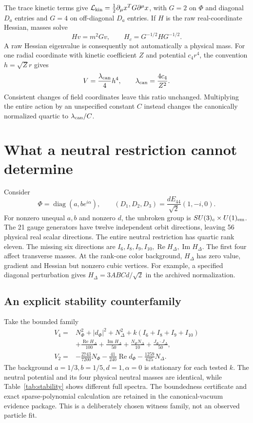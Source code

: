 \documentclass[11pt]{article}
\newcommand{\Rea}{\operatorname{Re}}
\newcommand{\Ima}{\operatorname{Im}}
\begin{document}
The trace kinetic terms give
$\mathcal L_{\rm kin}=\tfrac12\partial_\mu x^TG\partial^\mu x$,
with $G=2$ on $\Phi$ and diagonal $D_a$ entries and $G=4$ on off-diagonal
$D_a$ entries. If $H$ is the raw real-coordinate Hessian, masses solve
\begin{equation}
 Hv=m^2Gv,\qquad H_c=G^{-1/2}HG^{-1/2}.
\end{equation}
A raw Hessian eigenvalue is consequently not automatically a physical mass.
For one radial coordinate with kinetic coefficient $Z$ and potential
$c_4r^4$, the convention $h=\sqrt Zr$ gives
\begin{equation}
 V=\frac{\lambda_{\rm can}}4h^4,
 \qquad \lambda_{\rm can}=\frac{4c_4}{Z^2}.
\end{equation}
Consistent changes of field coordinates leave this ratio unchanged.
Multiplying the entire action by an unspecified constant $C$ instead changes
the canonically normalized quartic to $\lambda_{\rm can}/C$.

\section{What a neutral restriction cannot determine}
Consider
\begin{equation}\label{eq:neutral}
 \Phi=\operatorname{diag}(a,b e^{i\alpha}),\qquad
 (D_1,D_2,D_3)=\frac{dE_{44}}{\sqrt2}(1,-i,0).
\end{equation}
For nonzero unequal $a,b$ and nonzero $d$, the unbroken group is
$SU(3)_c\times U(1)_{\rm em}$. The 21 gauge generators have twelve
independent orbit directions, leaving 56 physical real scalar directions.
The entire neutral restriction has quartic rank eleven. The missing six
directions are $I_6,I_8,I_9,I_{10},\Rea H_\Delta,\Ima H_\Delta$.
The first four affect transverse masses. At the rank-one color background,
$H_\Delta$ has zero value, gradient and Hessian but nonzero cubic vertices.
For example, a specified diagonal perturbation gives
$H_\Delta=3ABCd/\sqrt2$ in the archived normalization.

\subsection{An explicit stability counterfamily}
Take the bounded family
\begin{align}
 V_4={}&N_\Phi^2+|d_\Phi|^2+N_\Delta^2
 +k(I_6+I_8+I_9+I_{10})\nonumber\\
 &+\frac{\Rea H_\Delta}{100}+\frac{\Ima H_\Delta}{50}
 +\frac{N_\Phi N_\Delta}{10}+\frac{J_\Phi\cdot J_\Delta}{50},\\
 V_2={}&-\frac{2743}{7200}N_\Phi
 -\frac{41}{240}\Rea d_\Phi-\frac{1259}{625}N_\Delta.
\end{align}
The background $a=1/3,b=1/5,d=1,\alpha=0$ is stationary for each
tested $k$. The neutral potential and its four physical neutral masses
are identical, while Table~\ref{tab:stability} shows different full spectra.
The boundedness certificate and exact sparse-polynomial calculation are
retained in the canonical-vacuum evidence package. This is a deliberately
chosen witness family, not an observed particle fit.
\end{document}
